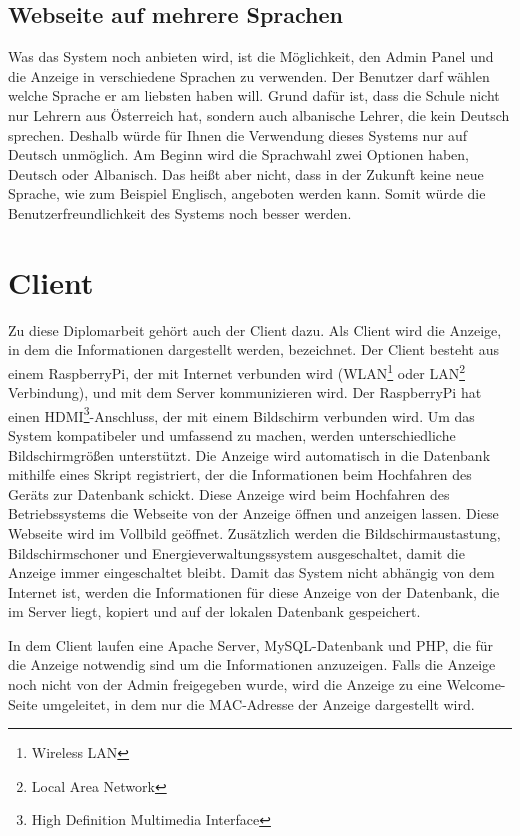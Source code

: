 \subsection{Webseite auf mehrere Sprachen}

Was das System noch anbieten wird, ist die Möglichkeit, den Admin Panel und die Anzeige in verschiedene Sprachen zu verwenden. Der Benutzer darf wählen welche Sprache er am liebsten haben will. Grund dafür ist, dass die Schule nicht nur Lehrern aus Österreich hat, sondern auch albanische Lehrer, die kein Deutsch sprechen. Deshalb würde für Ihnen die Verwendung dieses Systems nur auf Deutsch unmöglich. Am Beginn wird die Sprachwahl zwei Optionen haben, Deutsch oder Albanisch. Das heißt aber nicht, dass in der Zukunft keine neue Sprache, wie zum Beispiel Englisch, angeboten werden kann. Somit würde die Benutzerfreundlichkeit des Systems noch besser werden.

\section{Client}

Zu diese Diplomarbeit geh\"{o}rt auch der Client dazu. Als Client wird die Anzeige, in dem die Informationen dargestellt werden, bezeichnet. Der Client besteht aus einem RaspberryPi, der mit Internet verbunden wird (WLAN\footnote{Wireless LAN} oder LAN\footnote{Local Area Network} Verbindung), und mit dem Server kommunizieren wird. Der RaspberryPi hat einen HDMI\footnote{High Definition Multimedia Interface}-Anschluss, der mit einem Bildschirm verbunden wird. Um das System kompatibeler und umfassend zu machen, werden unterschiedliche Bildschirmgr\"{o}\ss{}en unterst\"{u}tzt. Die Anzeige wird automatisch  in die Datenbank mithilfe eines Skript registriert, der die Informationen beim Hochfahren des Ger\"{a}ts zur Datenbank schickt. Diese Anzeige wird beim Hochfahren des Betriebssystems die Webseite von der Anzeige \"{o}ffnen und anzeigen lassen. Diese Webseite wird im Vollbild ge\"{o}ffnet. Zus\"{a}tzlich werden die Bildschirmaustastung, Bildschirmschoner und Energieverwaltungssystem ausgeschaltet, damit die Anzeige immer eingeschaltet bleibt. Damit das System nicht abh\"{a}ngig von dem Internet ist, werden die Informationen f\"{u}r diese Anzeige von der Datenbank, die im Server liegt, kopiert und auf der lokalen Datenbank gespeichert. 

In dem Client laufen eine Apache Server, MySQL-Datenbank und PHP, die f\"{u}r die Anzeige notwendig sind um die Informationen anzuzeigen. Falls die Anzeige noch nicht von der Admin freigegeben wurde, wird die Anzeige zu eine Welcome-Seite umgeleitet, in dem nur die MAC-Adresse der Anzeige dargestellt wird.

